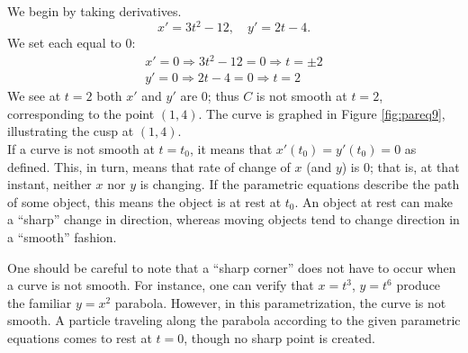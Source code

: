 {We begin by taking derivatives. 
$$x' = 3t^2-12,\quad y' = 2t-4.$$
We set each equal to 0:
$$\begin{array}{l}x' = 0 \Rightarrow 3t^2-12=0 \Rightarrow t=\pm 2\\
  y'=0 \Rightarrow 2t-4 = 0 \Rightarrow t=2
	\end{array}
	$$
We see at $t=2$ both $x'$ and $y'$ are 0; thus $C$ is not smooth at $t=2$, corresponding to the point $(1,4)$. The curve is graphed in Figure \ref{fig:pareq9}, illustrating the cusp at $(1,4)$.
}\\

If a curve is not smooth at $t=t_0$, it means that $x'(t_0)=y'(t_0)=0$ as defined. This, in turn, means that rate of change of $x$ (and $y$) is 0; that is, at that instant, neither $x$ nor $y$ is changing. If the parametric equations describe the path of some object, this means the object is at rest at $t_0$. An object at rest can make a ``sharp'' change in direction, whereas moving objects tend to change direction in a ``smooth'' fashion.

One should be careful to note that a ``sharp corner'' does not have to occur when a curve is not smooth. For instance, one can verify that $x=t^3$, $y=t^6$ produce the familiar $y=x^2$ parabola. However, in this parametrization, the curve is not smooth. A particle traveling along the parabola according to the given parametric equations comes to rest at $t=0$, though no sharp point is created.



